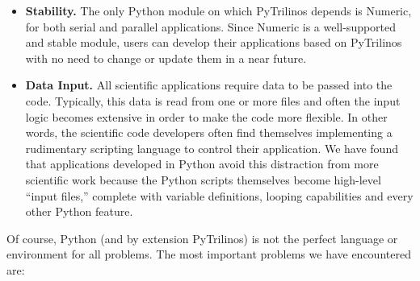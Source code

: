 \documentclass[acmtocl]{acmtrans2m}
\newcommand{\PyTrilinos}{{PyTrilinos}}
\begin{document}
\begin{itemize}
\item {\bf Stability.} The only Python module on which PyTrilinos
  depends is Numeric, for both serial and parallel applications. Since
  Numeric is a well-supported and stable module, users can develop
  their applications based on PyTrilinos with no need to change or
  update them in a near future.

\item {\bf Data Input.} All scientific applications require data to be
  passed into the code.  Typically, this data is read from one or more
  files and often the input logic becomes extensive in order to make
  the code more flexible.  In other words, the scientific code
  developers often find themselves implementing a rudimentary
  scripting language to control their application.  We have found that
  applications developed in Python avoid this distraction from more
  scientific work because the Python scripts themselves become
  high-level ``input files,'' complete with variable definitions,
  looping capabilities and every other Python feature.

\end{itemize}

\smallskip

Of course, Python (and by extension PyTrilinos) is not the perfect
language or environment for all problems. The most important problems
we have encountered are:
\end{document}
